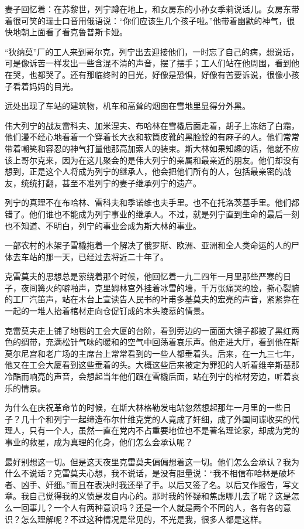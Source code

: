 妻子回忆着：在苏黎世，列宁蹲在地上，和女房东的小孙女季莉说话儿。女房东带着很可笑的瑞士口音用俄语说：“你们应该生几个孩子啦。”他带着幽默的神气，很快地朝上面看了看克鲁普斯卡娅。

“狄纳莫”厂的工人来到哥尔克，列宁出去迎接他们，一时忘了自己的病，想说话，可是像诉苦一样发出一些含混不清的声音，摆了摆手；工人们站在他周围，看到他在哭，也都哭了。还有那临终时的目光，好像是恐惧，好像有苦要诉说，很像小孩子看着妈妈的目光。

远处出现了车站的建筑物，机车和高耸的烟囱在雪地里显得分外黑。

伟大列宁的战友雷科夫、加米涅夫、布哈林在雪橇后面走着，胡子上冻结了白霜，他们漫不经心地看着一个穿着长大衣和软筒皮靴的黑脸膛的有麻子的人。他们常常带着嘲笑和容忍的神气打量他那高加索人的装束。斯大林如果知趣的话，他就不应该上哥尔克来，因为在这儿聚会的是伟大列宁的亲属和最亲近的朋友。他们却没有想到，正是这个人将成为列宁的继承人，他会把他们所有的人，包括最亲密的战友，统统打翻，甚至不准列宁的妻子继承列宁的遗产。

列宁的真理不在布哈林、雷科夫和季诺维也夫手里。也不在托洛茨基手里。他们都错了。他们谁也不能成为列宁事业的继承人。不过，就是列宁直到生命的最后一刻也不知道、不明白，列宁的事业会成为斯大林的事业。

一部农村的木架子雪橇拖着一个解决了俄罗斯、欧洲、亚洲和全人类命运的人的尸体去车站的那一天，已经过去将近二十年了。

克雷莫夫的思想总是萦绕着那个时候，他回忆着一九二四年一月里那些严寒的日子，夜间篝火的噼啪声，克里姆林宫外挂着冰雪的墙，千万张痛哭的脸，撕心裂腑的工厂汽笛声，站在木台上宣读告人民书的叶甫多基莫夫的宏亮的声音，紧紧靠在一起的一堆人抬着棺材走向仓促钉成的木头陵墓的情景。

克雷莫夫走上铺了地毯的工会大厦的台阶，看到旁边的一面面大镜子都披了黑红两色的绸带，充满松针气味的暖和的空气中回荡着哀乐声。他走进大厅，看到他在斯莫尔尼宫和老广场的主席台上常常看到的一些人都垂着头。后来，在一九三七年，他又在工会大厦看到这些垂着的头。大概这些后来被定为罪犯的人听着维辛斯基那冷酷而响亮的声音，会想起当年他们跟在雪橇后面，站在列宁的棺材旁边，听着哀乐的情景。

为什么在庆祝革命节的时候，在斯大林格勒发电站忽然想起那年一月里的一些日子？几十个和列宁一起缔造布尔什维克党的人竟成了奸细，成了外国间谍收买的代理人，只有一个人，虽然一直在党内不占重要地位也不是著名理论家，却成为党的事业的救星，成为真理的化身，他们怎么会承认呢？

最好别想这一切。但是这天夜里克雷莫夫偏偏想着这一切。他们怎么会承认？我为什么不说话？克雷莫夫心想，我不说话，是没有胆量说：“我不相信布哈林是破坏者、凶手、奸细。”而且在表决时我还举了手。以后又签了名。以后又作报告，写文章。我自己觉得我的义愤是发自内心的。那时我的怀疑和焦虑哪儿去了呢？这是怎么一回事儿？一个人有两种意识吗？还是一个人就是两个不同的人，各有各的意识？怎么理解呢？不过这种情况是常见的，不光是我，很多人都是这样。

